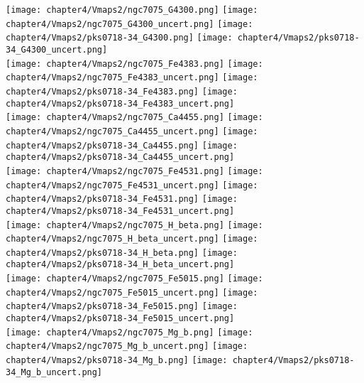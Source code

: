 \begin{figure*}
	\centering
	\texttt{[image: chapter4/Vmaps2/ngc7075\_G4300.png]}
	\texttt{[image: chapter4/Vmaps2/ngc7075\_G4300\_uncert.png]}
	\texttt{[image: chapter4/Vmaps2/pks0718-34\_G4300.png]}
	\texttt{[image: chapter4/Vmaps2/pks0718-34\_G4300\_uncert.png]}
	\\
	\texttt{[image: chapter4/Vmaps2/ngc7075\_Fe4383.png]}
	\texttt{[image: chapter4/Vmaps2/ngc7075\_Fe4383\_uncert.png]}
	\texttt{[image: chapter4/Vmaps2/pks0718-34\_Fe4383.png]}
	\texttt{[image: chapter4/Vmaps2/pks0718-34\_Fe4383\_uncert.png]}
	\\
	\texttt{[image: chapter4/Vmaps2/ngc7075\_Ca4455.png]}
	\texttt{[image: chapter4/Vmaps2/ngc7075\_Ca4455\_uncert.png]}
	\texttt{[image: chapter4/Vmaps2/pks0718-34\_Ca4455.png]}
	\texttt{[image: chapter4/Vmaps2/pks0718-34\_Ca4455\_uncert.png]}
	\\
	\texttt{[image: chapter4/Vmaps2/ngc7075\_Fe4531.png]}
	\texttt{[image: chapter4/Vmaps2/ngc7075\_Fe4531\_uncert.png]}
	\texttt{[image: chapter4/Vmaps2/pks0718-34\_Fe4531.png]}
	\texttt{[image: chapter4/Vmaps2/pks0718-34\_Fe4531\_uncert.png]}
	\\
	\texttt{[image: chapter4/Vmaps2/ngc7075\_H\_beta.png]}
	\texttt{[image: chapter4/Vmaps2/ngc7075\_H\_beta\_uncert.png]}
	\texttt{[image: chapter4/Vmaps2/pks0718-34\_H\_beta.png]}
	\texttt{[image: chapter4/Vmaps2/pks0718-34\_H\_beta\_uncert.png]}
	\\
	\texttt{[image: chapter4/Vmaps2/ngc7075\_Fe5015.png]}
	\texttt{[image: chapter4/Vmaps2/ngc7075\_Fe5015\_uncert.png]}
	\texttt{[image: chapter4/Vmaps2/pks0718-34\_Fe5015.png]}
	\texttt{[image: chapter4/Vmaps2/pks0718-34\_Fe5015\_uncert.png]}
	\\
	\texttt{[image: chapter4/Vmaps2/ngc7075\_Mg\_b.png]}
	\texttt{[image: chapter4/Vmaps2/ngc7075\_Mg\_b\_uncert.png]}
	\texttt{[image: chapter4/Vmaps2/pks0718-34\_Mg\_b.png]}
	\texttt{[image: chapter4/Vmaps2/pks0718-34\_Mg\_b\_uncert.png]}
	\\
\end{figure*}


